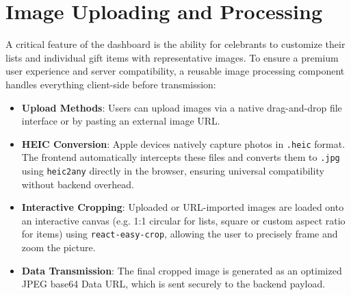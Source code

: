 \section{Image Uploading and Processing}
A critical feature of the dashboard is the ability for celebrants to customize their lists and individual gift items with representative images. To ensure a premium user experience and server compatibility, a reusable image processing component handles everything client-side before transmission:
\begin{itemize}
    \item \textbf{Upload Methods}: Users can upload images via a native drag-and-drop file interface or by pasting an external image URL. 
    \item \textbf{HEIC Conversion}: Apple devices natively capture photos in \texttt{.heic} format. The frontend automatically intercepts these files and converts them to \texttt{.jpg} using \texttt{heic2any} directly in the browser, ensuring universal compatibility without backend overhead.
    \item \textbf{Interactive Cropping}: Uploaded or URL-imported images are loaded onto an interactive canvas (e.g. 1:1 circular for lists, square or custom aspect ratio for items) using \texttt{react-easy-crop}, allowing the user to precisely frame and zoom the picture.
    \item \textbf{Data Transmission}: The final cropped image is generated as an optimized JPEG base64 Data URL, which is sent securely to the backend payload.
\end{itemize}

